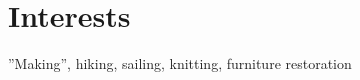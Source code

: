 \documentclass[10pt,letterpaper]{resume}
\begin{document}

\section{Interests}
''Making'', hiking, sailing, knitting, furniture restoration
\end{document}
